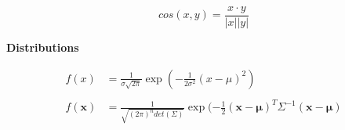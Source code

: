 \documentclass[fleqn,9pt]{article}
\begin{document}
\begin{minipage}[t]{.33333\textwidth}
\begin{equation*}
cos(x,y) = \frac{x \cdot y}{|x||y|}
\end{equation*}

\textbf{Distributions}

\begin{equation*}
\begin{split}
f(x) &= \frac{1}{\sigma\sqrt{2\pi}}\exp(-\frac{1}{2\sigma^2}(x-\mu)^2) \\
\\
f(\boldsymbol{x}) &= \frac{1}{\sqrt{(2\pi)^n det(\Sigma)}} \exp(-\frac{1}{2}(\boldsymbol{x}-\boldsymbol{\mu})^T \Sigma^{-1} (\boldsymbol{x}-\boldsymbol{\mu}) \\
\end{split}
\end{equation*}
\end{minipage}
\end{document}
